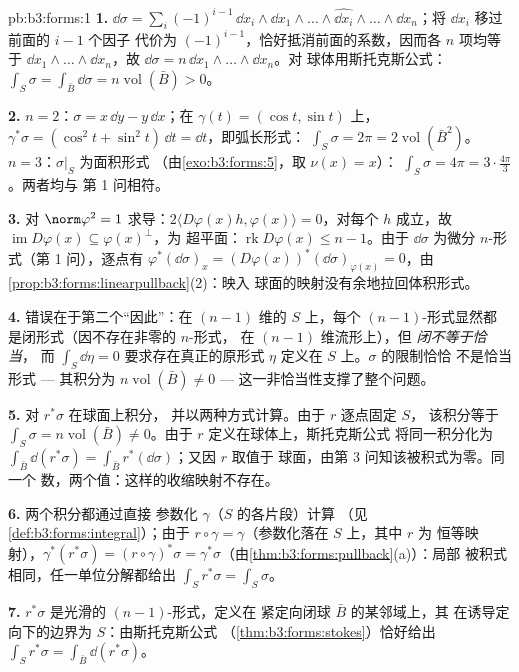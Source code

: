 \begin{solution}{pb:b3:forms:1}
\textbf{1.} $\dd\sigma = \sum_i(-1)^{i-1}\,\dd x_i\wedge\dd
x_1\wedge\dots\wedge\widehat{\dd x_i}\wedge\dots\wedge\dd
x_n$；将 $\dd x_i$ 移过前面的 $i-1$ 个因子
代价为 $(-1)^{i-1}$，恰好抵消前面的系数，因而各
$n$ 项均等于 $\dd x_1\wedge\dots\wedge\dd x_n$，故
$\dd\sigma = n\,\dd x_1\wedge\dots\wedge\dd x_n$。对
球体用斯托克斯公式：$\int_S\sigma = \int_{\bar B}\dd\sigma =
n\operatorname{vol}(\bar B) > 0$。

\textbf{2.} $n = 2$：$\sigma = x\,\dd y - y\,\dd x$；在
$\gamma(t) = (\cos t, \sin t)$ 上，$\gamma^*\sigma = (\cos^2t +
\sin^2t)\,\dd t = \dd t$，即弧长形式：
$\int_S\sigma = 2\pi = 2\operatorname{vol}(\bar B^2)$。
$n = 3$：$\sigma\vert_S$ 为面积形式
（由\cref{exo:b3:forms:5}，取 $\nu(x) = x$）：
$\int_S\sigma = 4\pi = 3\cdot\tfrac{4\pi}3$。两者均与
第 1 问相符。

\textbf{3.} 对 $\norm\varphi^2 = 1$ 求导：$2\langle
D\varphi(x)h, \varphi(x)\rangle = 0$，对每个 $h$ 成立，故
$\operatorname{im}D\varphi(x) \subseteq \varphi(x)^\perp$，为
超平面：$\operatorname{rk}D\varphi(x) \leq n - 1$。由于
$\dd\sigma$ 为微分 $n$-形式（第 1 问），逐点有
$\varphi^*(\dd\sigma)_x =
(D\varphi(x))^*(\dd\sigma)_{\varphi(x)} = 0$，由
\cref{prop:b3:forms:linearpullback}(2)：映入
球面的映射没有余地拉回体积形式。

\textbf{4.} 错误在于第二个“因此”：在
$(n-1)$ 维的 $S$ 上，每个 $(n-1)$-形式显然都
是闭形式（因不存在非零的 $n$-形式，
在 $(n-1)$ 维流形上），但 \emph{闭不等于恰当}，
而 $\int_S\dd\eta = 0$ 要求存在真正的原形式 $\eta$
定义在 $S$ 上。$\sigma$ 的限制恰恰
不是恰当形式 --- 其积分为 $n\operatorname{vol}(\bar B) \neq
0$ --- 这一非恰当性支撑了整个问题。

\textbf{5.} 对 $r^*\sigma$ 在球面上积分，
并以两种方式计算。由于 $r$ 逐点固定 $S$，
该积分等于 $\int_S\sigma = n\operatorname{vol}(\bar B)
\neq 0$。由于 $r$ 定义在球体上，斯托克斯公式
将同一积分化为 $\int_{\bar B}\dd(r^*\sigma) =
\int_{\bar B}r^*(\dd\sigma)$；又因 $r$ 取值于
球面，由第 3 问知该被积式为零。同一个
数，两个值：这样的收缩映射不存在。

\textbf{6.} 两个积分都通过直接
参数化 $\gamma$（$S$ 的各片段）计算
（见\cref{def:b3:forms:integral}）；由于 $r\circ\gamma =
\gamma$（参数化落在 $S$ 上，其中 $r$ 为
恒等映射），$\gamma^*(r^*\sigma) = (r\circ\gamma)^*\sigma =
\gamma^*\sigma$（由\cref{thm:b3:forms:pullback}(a)）：局部
被积式相同，任一单位分解都给出
$\int_Sr^*\sigma = \int_S\sigma$。

\textbf{7.} $r^*\sigma$ 是光滑的 $(n-1)$-形式，定义在
紧定向闭球 $\bar B$ 的某邻域上，其
在诱导定向下的边界为 $S$：由斯托克斯公式
（\cref{thm:b3:forms:stokes}）恰好给出
$\int_Sr^*\sigma = \int_{\bar B}\dd(r^*\sigma)$。


\end{solution}
